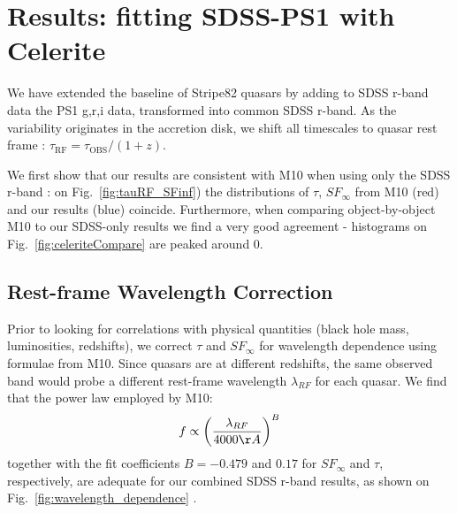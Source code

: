 \documentclass[twocolumn]{aastex62}
\begin{document}
%
%
%
%
%
%
%
%

\section{Results: fitting SDSS-PS1 with Celerite}\label{sec:results}

We have extended the baseline of Stripe82 quasars by adding to SDSS r-band data the  PS1 g,r,i data, transformed into common SDSS r-band. As the variability originates in the accretion disk, we shift all timescales to quasar rest frame : $\tau_{\mathrm{RF}} = \tau_{\mathrm{OBS}} / (1+z)$. 


\begin{figure*}
\caption{Comparing the rest-frame timescales $\tau$, and asymptotic variability amplitudes $SF_{\infty}$, for M10 SDSS r-band,  and combined SDSS and PS1 data.  }
\label{fig:tauRF_SFinf}
\end{figure*} 


We first show that our results are consistent with M10 when using only the SDSS r-band : on Fig.~\ref{fig:tauRF_SFinf}) the distributions of $\tau$, $SF_{\infty}$ from M10 (red) and our results (blue) coincide. Furthermore, when comparing object-by-object M10 to our SDSS-only results we find a very good agreement - histograms on Fig.~\ref{fig:celeriteCompare} are peaked around 0. 


\begin{figure*}
\caption{Plot comparing results for SDSS r-band fitting of  M10 ($\sigma_{m}, \tau_{m}$), and current results for SDSS r-band using Celerite ($\sigma_{fit}, \tau_{fit}$). }
\label{fig:celeriteCompare}
\end{figure*} 


\subsection{Rest-frame Wavelength Correction}

Prior to looking for correlations with physical quantities (black hole mass, luminosities, redshifts), we correct $\tau$ and $SF_{\infty}$ for wavelength dependence using formulae from M10. Since quasars are at different redshifts, the same observed band would probe a different rest-frame wavelength $\lambda_{RF}$ for each quasar. We find that the power law employed by M10:
\begin{equation}
f \propto \left( \frac{\lambda_{RF}}{4000 \AA} \right)^{B}
\end{equation}
together with the fit coefficients $B=-0.479$ and $0.17$ for $SF_{\infty}$ and $\tau$, respectively, are adequate for our combined SDSS r-band results, as shown on Fig.~\ref{fig:wavelength_dependence} . 
\end{document}
